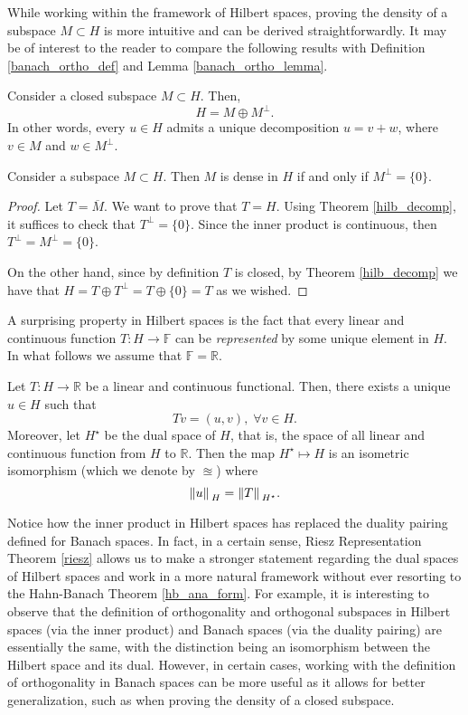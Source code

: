 While working within the framework of Hilbert spaces, proving the density of a subspace \(M \subset H\) is more intuitive and can be derived straightforwardly. It may be of interest to the reader to compare the following results with Definition \eqref{banach_ortho_def} and Lemma \eqref{banach_ortho_lemma}.
\begin{theorem}\label{hilb_decomp}
    Consider a closed subspace \(M \subset H\). Then,
    \[
    H = M \oplus M^\perp.
    \]
    In other words, every \(u \in H\) admits a unique decomposition \(u = v + w\), where \(v \in M\) and \(w \in M^\perp\).
\end{theorem}
\begin{corollary}\label{hilb_dense}
    Consider a subspace \(M \subset H\). Then \(M\) is dense in \(H\) if and only if \(M^\perp = \{0\}\).
\end{corollary}
\begin{proof}
    Let \(T = \overline{M}\). We want to prove that \(T = H\). Using Theorem \ref{hilb_decomp}, it suffices to check that \(T^\perp = \{0\}\). Since the inner product is continuous, then \(T^\perp = M^\perp = \{0\}\).
    
    On the other hand, since by definition \(T\) is closed, by Theorem \ref*{hilb_decomp} we have that \(H = T \oplus T^\perp = T \oplus \{0\} = T\) as we wished.
\end{proof}
A surprising property in Hilbert spaces is the fact that every linear and continuous function \(T: H \rightarrow \mathbb{F}\) can be \textit{represented} by some unique element in \(H\). In what follows we assume that \(\mathbb{F} = \mathbb{R}\).
\begin{theorem}\label{riesz}
    Let \(T: H \rightarrow \mathbb{R}\) be a linear and continuous functional. Then, there exists a unique \(u \in H\) such that
    \[
        T v = (u, v), \; \forall v \in H.
    \]
    Moreover, let \(H^\star\) be the dual space of \(H\), that is, the space of all linear and continuous function from \(H\) to \(\mathbb{R}\). Then the map \(H^\star \mapsto H\) is an isometric isomorphism (which we denote by \(\approxeq\)) where
    \[
        \norm*{u}_H = \norm*{T}_{H^\star}.
    \]
\end{theorem} 
\begin{remark}
    Notice how the inner product in Hilbert spaces has replaced the duality pairing defined for Banach spaces. In fact, in a certain sense, Riesz Representation Theorem \eqref{riesz} allows us to make a stronger statement regarding the dual spaces of Hilbert spaces and work in a more natural framework without ever resorting to the Hahn-Banach Theorem \eqref{hb_ana_form}. For example, it is interesting to observe that the definition of orthogonality and orthogonal subspaces in Hilbert spaces (via the inner product) and Banach spaces (via the duality pairing) are essentially the same, with the distinction being an isomorphism between the Hilbert space and its dual. However, in certain cases, working with the definition of orthogonality in Banach spaces can be more useful as it allows for better generalization, such as when proving the density of a closed subspace.
\end{remark}
